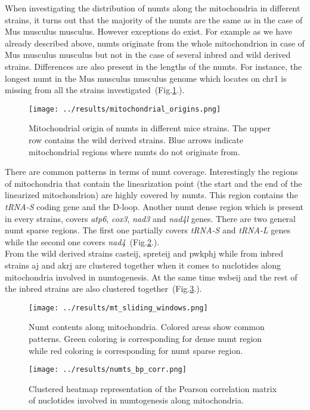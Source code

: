 \documentclass[a4paper,12pt]{article}
\numberwithin{equation}{section} %
\begin{document}
\indent When investigating the distribution of numts along the mitochondria in different strains, it turns out that the majority of the numts are the same as in the case of Mus musculus musculus. However exceptions do exist. For example as we have already described above,  numts originate from the whole mitochondrion in case of Mus musculus musculus but not in the case of several inbred and wild derived strains. Differences are also present in the lengths of the numts. For instance, the longest numt in the Mus musculus musculus genome which locates on chr1 is missing from all the strains investigated~(Fig.\ref{fig:mitochondrial_origins}.). 
\begin{figure}[H]
    \centering
    \captionsetup{justification=centering}
    \texttt{[image: ../results/mitochondrial\_origins.png]}
    \caption{Mitochondrial origin of numts in different mice strains. The upper row contains the wild derived strains. Blue arrows indicate mitochondrial regions where numts do not originate from.}
    \label{fig:mitochondrial_origins}
\end{figure}

\indent There are common patterns in terms of  numt coverage. Interestingly the regions of mitochondria that contain the linearization point (the start and the end of the linearized mitochondrion) are highly covered by numts. This region contains the \textit{tRNA-S} coding gene and the D-loop. Another numt dense region which is present in every strains, covers \textit{atp6}, \textit{cox3}, \textit{nad3} and \textit{nad4l} genes. There are two general numt sparse regions. The first one partially covers \textit{tRNA-S} and \textit{tRNA-L} genes while the second one covers \textit{nad4}~(Fig.\ref{fig:mt_sliding_windows}.).\\ \indent From the wild derived strains casteij, spreteij and pwkphj while from inbred strains aj and akrj are clustered together when it comes to nuclotides along mitochondria involved in numtogenesis. At the same time wsbeij and the rest of the inbred strains are also clustered together~(Fig.\ref{fig:numts_bp_corr}.).
\begin{figure}[H]
    \centering
    \captionsetup{justification=centering}
    \texttt{[image: ../results/mt\_sliding\_windows.png]}
    \caption{Numt contents along mitochondria. Colored areas show common patterns. Green coloring is corresponding for dense numt region while red coloring is corresponding for numt sparse region.}
    \label{fig:mt_sliding_windows}
\end{figure}
\begin{figure}[H]
    \centering
    \captionsetup{justification=centering}
    \texttt{[image: ../results/numts\_bp\_corr.png]}
    \caption{Clustered heatmap representation of the Pearson correlation matrix of nuclotides involved in numtogenesis along mitochondria.}
    \label{fig:numts_bp_corr}
\end{figure}
\end{document}
